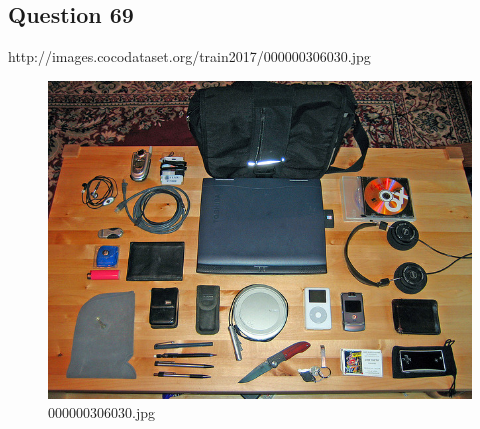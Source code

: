 \subsection*{Question 69}
http://images.cocodataset.org/train2017/000000306030.jpg
\begin{figure}[h]
    \centering
    \includegraphics[width=0.8\linewidth]{../image set/hard/000000306030.jpg}
    \caption{000000306030.jpg}
\end{figure}
